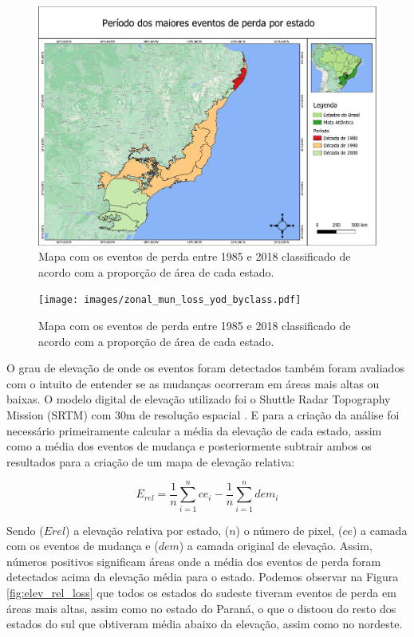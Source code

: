 \begin{figure}[H]
    \centering
    \includegraphics[scale=.5]{images/zonal_loss_yod_byclass.pdf}
    \caption{Mapa com os eventos de perda entre 1985 e 2018 classificado de acordo com a proporção de área de cada estado.}
    \label{fig:zonal_loss_yod_byclass}
\end{figure}

\begin{figure}[H]
    \centering
    \texttt{[image: images/zonal\_mun\_loss\_yod\_byclass.pdf]}
    \caption{Mapa com os eventos de perda entre 1985 e 2018 classificado de acordo com a proporção de área de cada estado.}
    \label{fig:zonal_mun_loss_yod_byclass}
\end{figure}

O grau de elevação de onde os eventos foram detectados também foram avaliados com o intuito de entender se as mudanças ocorreram em áreas mais altas ou baixas. O modelo digital de elevação utilizado foi o Shuttle Radar Topography Mission (SRTM) com 30m de resolução espacial \citep{srtm30m}. E para a criação da análise foi necessário primeiramente calcular a média da elevação de cada estado, assim como a média dos eventos de mudança e posteriormente subtrair ambos os resultados para a criação de um mapa de elevação relativa:

\begin{equation}
E_{rel} = \frac{1}{n}\sum_{i = 1}^{n} ce_{i} - \frac{1}{n}\sum_{i = 1}^{n} dem_{i} 
\end{equation}

Sendo ($Erel$) a elevação relativa por estado, ($n$) o número de pixel, ($ce$) a camada com os eventos de mudança e ($dem$) a camada original de elevação. Assim, números positivos significam áreas onde a média dos eventos de perda foram detectados acima da elevação média para o estado. Podemos observar na Figura \ref{fig:elev_rel_loss} que todos os estados do sudeste tiveram eventos de perda em áreas mais altas, assim como no estado do Paraná, o que o distoou do resto dos estados do sul que obtiveram média abaixo da elevação, assim como no nordeste.


